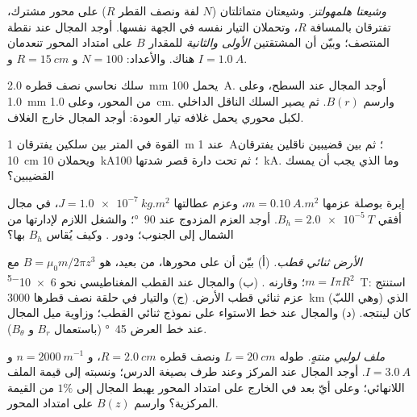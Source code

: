 \begin{exercise}[$\star\star$]\label{exo:b1:magnetostatics:6}
\emph{وشيعتا هلمهولتز.} وشيعتان متماثلتان ($N$ لفة ونصف القطر $R$) على
محور مشترك، تفترقان بالمسافة $R$، وتحملان التيار نفسه في الجهة
نفسها. أوجد المجال عند نقطة المنتصف؛ وبيّن أن المشتقتين \emph{الأولى والثانية}
للمقدار $B$ على امتداد المحور تنعدمان هناك. والأعداد: $N = 100$
و $R = \qty{15}{cm}$ و $I = \qty{1.0}{A}$.
\end{exercise}

\begin{exercise}[$\star\star$]\label{exo:b1:magnetostatics:7}
سلك نحاسي نصف قطره \qty{2.0}{mm} يحمل \qty{100}{A}. أوجد المجال عند
السطح، وعلى \qty{1.0}{mm} من المحور، وعلى \qty{1.0}{cm}. وارسم $B(r)$.
ثم يصير السلك الناقل الداخلي لكبل محوري يحمل غلافه
تيار العودة: أوجد المجال خارج الغلاف.
\end{exercise}

\begin{exercise}[$\star\star$]\label{exo:b1:magnetostatics:8}
القوة في المتر بين سلكين يفترقان \qty{1}{m} عند \qty{1}{A}؛ ثم بين
قضيبين ناقلين يفترقان \qty{10}{cm} ويحملان \qty{10}{kA}؛ ثم تحت
دارة قصر شدتها \qty{100}{kA}. وما الذي يجب أن يمسك القضيبين؟
\end{exercise}

\begin{exercise}[$\star\star$]\label{exo:b1:magnetostatics:9}
إبرة بوصلة عزمها $m = \qty{0.10}{A.m^2}$، وعزم عطالتها
$J = \qty{1.0e-7}{kg.m^2}$، في مجال أفقي $B_h = \qty{2.0e-5}{T}$.
أوجد العزم المزدوج عند \qty{90}{\degree}؛ والشغل اللازم لإدارتها من الشمال إلى الجنوب؛ ودور
. وكيف يُقاس $B_h$ بها؟
\end{exercise}

\begin{exercise}[$\star\star\star$]\label{exo:b1:magnetostatics:10}
\emph{الأرض ثنائي قطب.} (أ) بيّن أن  على محورها،
من بعيد، هو $B = \mu_0m/2\pi z^3$ مع $m = I\pi R^2$؛ وقارنه
. (ب) والمجال عند القطب المغناطيسي نحو
\qty{6e-5}{T}: استنتج عزم ثنائي قطب الأرض. (ج) والتيار في حلقة
نصف قطرها \qty{3000}{km} (وهي اللبّ) الذي كان لينتجه. (د) والمجال عند
خط الاستواء على نموذج ثنائي القطب؛ وزاوية ميل المجال عند
خط العرض \qty{45}{\degree} (باستعمال $B_r$ و $B_\theta$).
\end{exercise}

\begin{exercise}[$\star\star\star$]\label{exo:b1:magnetostatics:11}
\emph{ملف لولبي منتهٍ.} طوله $L = \qty{20}{cm}$ ونصف قطره $R = \qty{2.0}{cm}$،
و $n = \qty{2000}{m^{-1}}$ و $I = \qty{3.0}{A}$. أوجد المجال عند المركز وعند
طرف بصيغة الدرس؛ ونسبته إلى قيمة الملف اللانهائي؛
وعلى أيّ بعد في الخارج على امتداد المحور يهبط المجال إلى
$1\%$ من القيمة المركزية؟ وارسم $B(z)$ على امتداد المحور.
\end{exercise}

